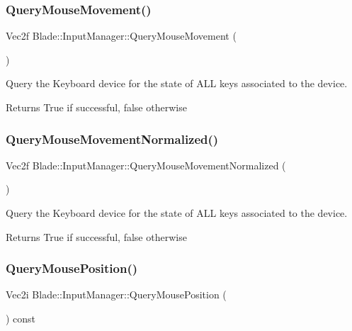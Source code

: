 \subsubsection{\texorpdfstring{Query\+Mouse\+Movement()}{QueryMouseMovement()}}
{\footnotesize\ttfamily Vec2f Blade\+::\+Input\+Manager\+::\+Query\+Mouse\+Movement (\begin{DoxyParamCaption}{ }\end{DoxyParamCaption})}



Query the Keyboard device for the state of A\+LL keys associated to the device. 

\begin{DoxyReturn}{Returns}
True if successful, false otherwise 
\end{DoxyReturn}
\mbox{\label{class_blade_1_1_input_manager_aa96a587de7ed5234b2b7883df48c0a09}} 
\subsubsection{\texorpdfstring{Query\+Mouse\+Movement\+Normalized()}{QueryMouseMovementNormalized()}}
{\footnotesize\ttfamily Vec2f Blade\+::\+Input\+Manager\+::\+Query\+Mouse\+Movement\+Normalized (\begin{DoxyParamCaption}{ }\end{DoxyParamCaption})}



Query the Keyboard device for the state of A\+LL keys associated to the device. 

\begin{DoxyReturn}{Returns}
True if successful, false otherwise 
\end{DoxyReturn}
\mbox{\label{class_blade_1_1_input_manager_a0bd64dfa38174d3fa87c445ee261d8c3}} 
\subsubsection{\texorpdfstring{Query\+Mouse\+Position()}{QueryMousePosition()}}
{\footnotesize\ttfamily Vec2i Blade\+::\+Input\+Manager\+::\+Query\+Mouse\+Position (\begin{DoxyParamCaption}{ }\end{DoxyParamCaption}) const\hspace{0.3cm}{\ttfamily [noexcept]}}



